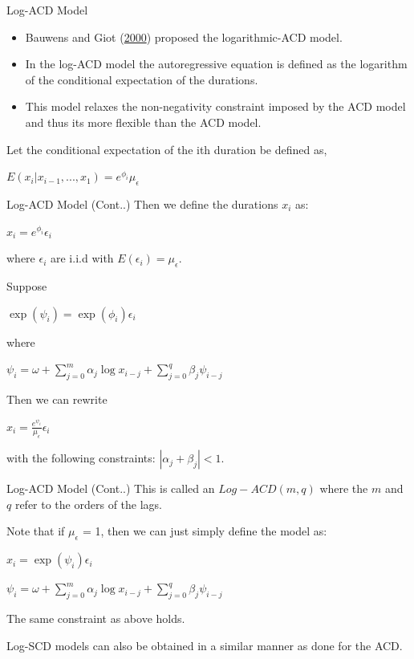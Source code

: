 \documentclass[
  ignorenonframetext,
]{beamer}
\begin{document}
\begin{frame}{Log-ACD Model}
\protect\hypertarget{log-acd-model}{}
\begin{itemize}
\item
  Bauwens and Giot (\protect\hyperlink{ref-LogACD}{2000}) proposed the
  logarithmic-ACD model.
\item
  In the log-ACD model the autoregressive equation is defined as the
  logarithm of the conditional expectation of the durations.
\item
  This model relaxes the non-negativity constraint imposed by the ACD
  model and thus its more flexible than the ACD model.
\end{itemize}

Let the conditional expectation of the ith duration be defined as,

\(E(x_i | x_{i-1}, ..., x_1) = e^{\phi_i} \mu_{\epsilon}\)
\end{frame}

\begin{frame}{Log-ACD Model (Cont..)}
\protect\hypertarget{log-acd-model-cont..}{}
Then we define the durations \(x_i\) as:

\(x_i = e^{\phi_i} \epsilon_i\)

where \(\epsilon_i\) are i.i.d with \(E(\epsilon_i)=\mu_{\epsilon}\).

Suppose

\(\exp(\psi_i) = \exp(\phi_i) \epsilon_i\)

where

\(\psi_i = \omega + \sum_{j=0}^m \alpha_j \log x_{i-j} + \sum_{j=0}^q \beta_j \psi_{i-j}\)

Then we can rewrite

\(x_i = \frac{e^{\psi_i}}{\mu_{\epsilon}} \epsilon_i\)

with the following constraints: \(|\alpha_j + \beta_j| < 1\).
\end{frame}

\begin{frame}{Log-ACD Model (Cont..)}
\protect\hypertarget{log-acd-model-cont..-1}{}
This is called an \(Log-ACD(m, q)\) where the \(m\) and \(q\) refer to
the orders of the lags.

Note that if \(\mu_{\epsilon}\) = 1, then we can just simply define the
model as:

\(x_i = \exp(\psi_i) \epsilon_i\)

\(\psi_i = \omega + \sum_{j=0}^m \alpha_j \log x_{i-j} + \sum_{j=0}^q \beta_j \psi_{i-j}\)

The same constraint as above holds.

Log-SCD models can also be obtained in a similar manner as done for the
ACD.
\end{frame}
\end{document}
